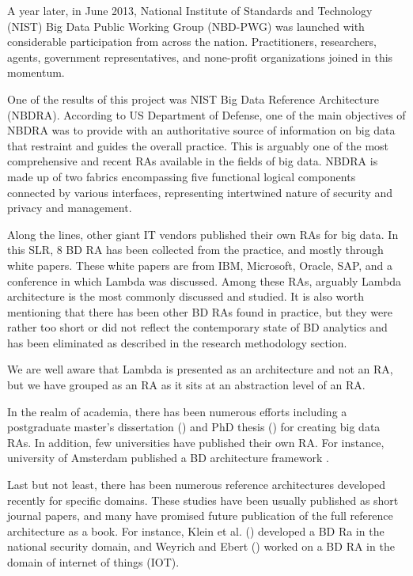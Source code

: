 \documentclass{ieeeaccess}
\begin{document}
A year later, in June 2013, National Institute of Standards and Technology (NIST) Big Data Public Working Group (NBD-PWG) was launched with considerable participation from across the nation. Practitioners, researchers, agents, government representatives, and none-profit organizations joined in this momentum.

One of the results of this project was NIST Big Data Reference Architecture (NBDRA). According to US Department of Defense, one of the main objectives of NBDRA was to provide with an authoritative source of information on big data that restraint and guides the overall practice. This is arguably one of the most comprehensive and recent RAs available in the fields of big data. NBDRA is made up of two fabrics encompassing five functional logical components connected by various interfaces, representing intertwined nature of security and privacy and management.

Along the lines, other giant IT vendors published their own RAs for big data. In this SLR, 8 BD RA has been collected from the practice, and mostly through white papers. These white papers are from IBM, Microsoft, Oracle, SAP, and a conference in which Lambda was discussed. Among these RAs, arguably Lambda architecture is the most commonly discussed and studied. It is also worth mentioning that there has been other BD RAs found in practice, but they were rather too short or did not reflect the contemporary state of BD analytics and has been eliminated as described in the research methodology section.

We are well aware that Lambda is presented as an architecture and not an RA, but we have grouped as an RA as it sits at an abstraction level of an RA.

In the realm of academia, there has been numerous efforts including a postgraduate master’s dissertation (\cite{Maier}) and PhD thesis (\cite{suthakar2017scalable}) for creating big data RAs. In addition, few universities have published their own RA. For instance, university of Amsterdam published a BD architecture framework \cite{framework2015draft}. 

Last but not least, there has been numerous reference architectures developed recently for specific domains. These studies have been usually published as short journal papers, and many have promised future publication of the full reference architecture as a book. For instance, Klein et al. (\cite{Klein}) developed a BD Ra in the national security domain, and Weyrich and Ebert (\cite{weyrich2015reference}) worked on a BD RA in the domain of internet of things (IOT). 
\end{document}
